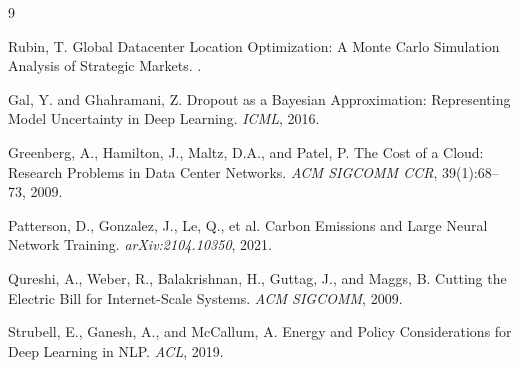 \documentclass[12pt,a4paper]{article}
\begin{document}

\begin{thebibliography}{9}

{Rubin, T.}
\newblock Global Datacenter Location Optimization: A Monte Carlo Simulation Analysis of Strategic Markets.
.

{Gal, Y. and Ghahramani, Z.}
\newblock Dropout as a Bayesian Approximation: Representing Model Uncertainty in Deep Learning.
\newblock \emph{ICML}, 2016.

{Greenberg, A., Hamilton, J., Maltz, D.A., and Patel, P.}
\newblock The Cost of a Cloud: Research Problems in Data Center Networks.
\newblock \emph{ACM SIGCOMM CCR}, 39(1):68--73, 2009.

{Patterson, D., Gonzalez, J., Le, Q., et al.}
\newblock Carbon Emissions and Large Neural Network Training.
\newblock \emph{arXiv:2104.10350}, 2021.

{Qureshi, A., Weber, R., Balakrishnan, H., Guttag, J., and Maggs, B.}
\newblock Cutting the Electric Bill for Internet-Scale Systems.
\newblock \emph{ACM SIGCOMM}, 2009.

{Strubell, E., Ganesh, A., and McCallum, A.}
\newblock Energy and Policy Considerations for Deep Learning in NLP.
\newblock \emph{ACL}, 2019.

\end{thebibliography}
\end{document}
